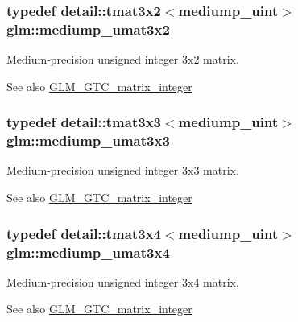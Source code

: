\subsubsection[{mediump\+\_\+umat3x2}]{\setlength{\rightskip}{0pt plus 5cm}typedef detail\+::tmat3x2$<$mediump\+\_\+uint$>$ {\bf glm\+::mediump\+\_\+umat3x2}}\label{group__gtc__matrix__integer_gaa8022553d8ad1a133f9ebe75a50dbee1}
Medium-\/precision unsigned integer 3x2 matrix. \begin{DoxySeeAlso}{See also}
\hyperlink{group__gtc__matrix__integer}{G\+L\+M\+\_\+\+G\+T\+C\+\_\+matrix\+\_\+integer} 
\end{DoxySeeAlso}
\hypertarget{group__gtc__matrix__integer_ga51665c5e422b057ca25a67a939c78ceb}{}
\subsubsection[{mediump\+\_\+umat3x3}]{\setlength{\rightskip}{0pt plus 5cm}typedef detail\+::tmat3x3$<$mediump\+\_\+uint$>$ {\bf glm\+::mediump\+\_\+umat3x3}}\label{group__gtc__matrix__integer_ga51665c5e422b057ca25a67a939c78ceb}
Medium-\/precision unsigned integer 3x3 matrix. \begin{DoxySeeAlso}{See also}
\hyperlink{group__gtc__matrix__integer}{G\+L\+M\+\_\+\+G\+T\+C\+\_\+matrix\+\_\+integer} 
\end{DoxySeeAlso}
\hypertarget{group__gtc__matrix__integer_gac432c4520a4843bd269d4393a19031a4}{}
\subsubsection[{mediump\+\_\+umat3x4}]{\setlength{\rightskip}{0pt plus 5cm}typedef detail\+::tmat3x4$<$mediump\+\_\+uint$>$ {\bf glm\+::mediump\+\_\+umat3x4}}\label{group__gtc__matrix__integer_gac432c4520a4843bd269d4393a19031a4}
Medium-\/precision unsigned integer 3x4 matrix. \begin{DoxySeeAlso}{See also}
\hyperlink{group__gtc__matrix__integer}{G\+L\+M\+\_\+\+G\+T\+C\+\_\+matrix\+\_\+integer} 
\end{DoxySeeAlso}
\hypertarget{group__gtc__matrix__integer_ga41f8522ec6855007e5221193b58b156b}{}
